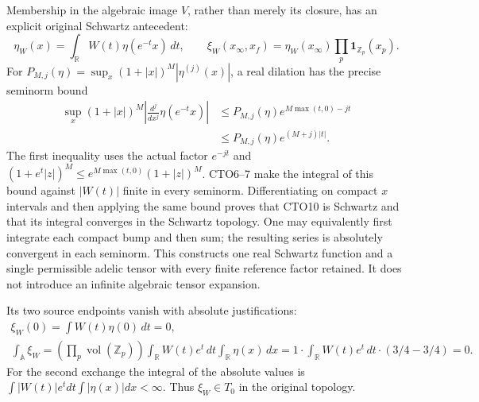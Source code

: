 Membership in the algebraic image $V$, rather than merely its closure,
has an explicit original Schwartz antecedent:
\begin{equation}\tag{CTO10}
\eta_W(x)=\int_{\mathbb R}W(t)\eta(e^{-t}x)\,dt,
\qquad
\xi_W(x_\infty,x_f)=\eta_W(x_\infty)
                          \prod_p\mathbf1_{\mathbb Z_p}(x_p).
\end{equation}
For $P_{M,j}(\eta)=\sup_x(1+|x|)^M|\eta^{(j)}(x)|$, a real
dilation has the precise seminorm bound
\begin{equation}\tag{CTO11}
\begin{split}
\sup_x(1+|x|)^M
 \left|\frac{d^j}{dx^j}\eta(e^{-t}x)\right|
&\le P_{M,j}(\eta)e^{M\max(t,0)-jt}\\
&\le P_{M,j}(\eta)e^{(M+j)|t|}.
\end{split}
\end{equation}
The first inequality uses the actual factor $e^{-jt}$ and
$(1+e^t|z|)^M\le e^{M\max(t,0)}(1+|z|)^M$.
CTO6--7 make the integral of this bound against $|W(t)|$ finite
in every seminorm. Differentiating on compact $x$ intervals and
then applying the same bound proves that CTO10 is Schwartz and
that its integral converges in the Schwartz topology. One may
equivalently first integrate each compact bump and then sum;
the resulting series is absolutely convergent in each seminorm.
This constructs one real Schwartz function and a single permissible
adelic tensor with every finite reference factor retained. It
does not introduce an infinite algebraic tensor expansion.

Its two source endpoints vanish with absolute justifications:
\begin{equation}\tag{CTO12}
\begin{gathered}
\xi_W(0)=\int W(t)\eta(0)\,dt=0,\\
\int_{\mathbb A}\xi_W
 =\left(\prod_p\operatorname{vol}(\mathbb Z_p)\right)
    \int_{\mathbb R}W(t)e^t\,dt\int_{\mathbb R}\eta(x)\,dx
 =1\cdot\int_{\mathbb R}W(t)e^t\,dt\cdot(3/4-3/4)=0.
\end{gathered}
\end{equation}
For the second exchange the integral of the absolute values is
$\int|W(t)|e^tdt\int|\eta(x)|dx<\infty$. Thus
$\xi_W\in T_0$ in the original topology.

